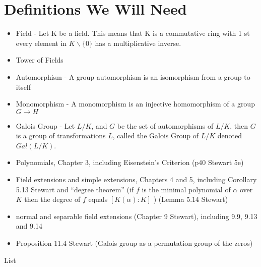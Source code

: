 
\section*{Definitions We Will Need}
\begin{itemize}
    \item Field - Let K be a field. This means that K is a commutative ring with 1 st every element in $K \backslash \{0\}$ has a multiplicative inverse.
    \item Tower of Fields
    \item Automorphism - A group automorphism is an isomorphism from a group to itself
    \item Monomorphism - A monomorphism is an injective homomorphism of a group $G \rightarrow{} H$
    \item Galois Group - Let $L/K$, and $G$ be the set of automorphisms of $L/K$. then $G$ is a group of transformations $L$, called the Galois Group of $L/K$ denoted $Gal(L/K)$.
    \item Polynomials, Chapter 3, including Eisenstein’s Criterion (p40 Stewart 5e)
    \item Field extensions and simple extensions, Chapters 4 and 5, including Corollary 5.13 Stewart and ``degree theorem'' (if $f$ is the minimal polynomial of $\alpha$ over $K$ then the degree of $f$ equals $[K(\alpha) : K]$ ) (Lemma 5.14 Stewart)
    \item normal and separable field extensions (Chapter 9 Stewart), including 9.9, 9.13 and 9.14
    \item Proposition 11.4 Stewart (Galois group as a permutation group of the zeros)
\end{itemize}

\TODO List

